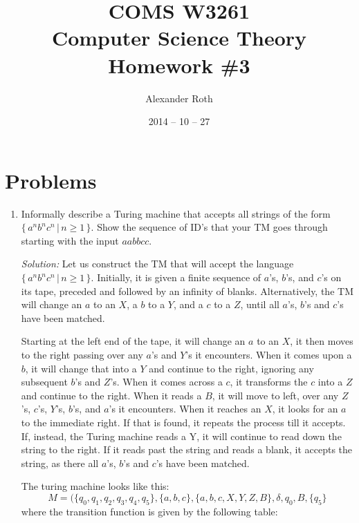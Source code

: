 \documentclass[]{article}
\begin{document}
\newtheorem{thm}{Theorem}
\title{COMS W3261 \\ Computer Science Theory \\ Homework \#3}
\author{Alexander Roth}
\date{2014 -- 10 -- 27}
\maketitle
\section*{Problems}
\begin{enumerate}
\item Informally describe a Turing machine that accepts all strings of the form
$\{\,a^nb^nc^n\,|\,n\geq1\,\}$. Show the sequence of ID's that your TM goes
through starting with the input $aabbcc$.
\item[\emph{Solution:}] Let us construct the TM that will accept the language $\{\,a^nb^nc^n\,|\,n\geq1\,\}$. Initially, it is given a finite sequence of $a$'s, $b$'s, and $c$'s on its tape, preceded and followed by an infinity of blanks. Alternatively, the TM will change an $a$ to an $X$, a $b$ to a $Y$, and a $c$ to a $Z$, until all $a$'s, $b$'s and $c$'s have been matched.

Starting at the left end of the tape, it will change an $a$ to an $X$, it then moves to the right passing over any $a$'s and $Y$'s it encounters. When it comes upon a $b$, it will change that into a $Y$ and continue to the right, ignoring any subsequent $b$'s and $Z$'s. When it comes across a $c$, it transforms the $c$ into a $Z$ and continue to the right. When it reads a $B$, it will move to left, over any $Z$'s, $c$'s, $Y$'s, $b$'s, and $a$'s it encounters. When it reaches an $X$, it looks for an $a$ to the immediate right. If that is found, it repeats the process till it accepts. If, instead, the Turing machine reads a Y, it will continue to read down the string to the right. If it reads past the string and reads a blank, it accepts the string, as there all $a$'s, $b$'s and $c$'s have been matched.

The turing machine looks like this:
\[ M = (\{q_0, q_1, q_2, q_3, q_4, q_5\}, \{a, b, c\}, \{a, b, c, X, Y, Z, B\}, \delta, q_0, B, \{q_5\} \]
where the transition function is given by the following table:\\


\end{enumerate}
\end{document}
